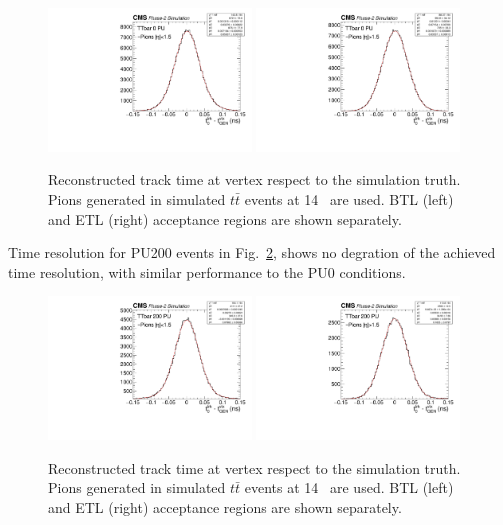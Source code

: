 \begin{figure}[!hbtp]
\centering
\includegraphics[width=0.48\textwidth]{fig/performance/ClusterAndTracks/res_t_pion_BTL.pdf}
\includegraphics[width=0.48\textwidth]{fig/performance/ClusterAndTracks/res_t_pion_ETL.pdf}
\caption{Reconstructed track time at vertex respect to the simulation truth. Pions generated in simulated $t\bar{t}$ events at 14~ are used. BTL (left) and ETL (right) acceptance regions are shown separately.}
\label{fig:trackt0vsgen}
\end{figure}

Time resolution for PU200 events in Fig.~\ref{fig:trackt0vsgen_PU200}, shows no degration of the achieved time resolution, with similar performance to the PU0 conditions.

\begin{figure}[!hbtp]
\centering
\includegraphics[width=0.48\textwidth]{fig/performance/ClusterAndTracks/res_t_pion_BTL_PU200.pdf}
\includegraphics[width=0.48\textwidth]{fig/performance/ClusterAndTracks/res_t_pion_ETL_PU200.pdf}
\caption{Reconstructed track time at vertex respect to the simulation truth. Pions generated in simulated $t\bar{t}$ events at 14~ are used. BTL (left) and ETL (right) acceptance regions are shown separately.}
\label{fig:trackt0vsgen_PU200}
\end{figure}

